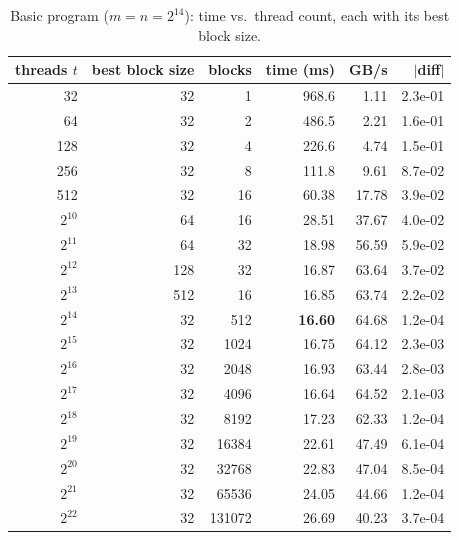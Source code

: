 \begin{table}[H]\centering\small
\caption{Basic program ($m=n=2^{14}$): time vs.\ thread count, each with its best block size.}\label{tab:q2basic}
\begin{tabular}{rrrrrr}
\toprule
threads $t$ & best block size & blocks & time (ms) & GB/s & $|$diff$|$ \\
\midrule
32 & 32 & 1 & 968.6 & 1.11 & 2.3e-01 \\
64 & 32 & 2 & 486.5 & 2.21 & 1.6e-01 \\
128 & 32 & 4 & 226.6 & 4.74 & 1.5e-01 \\
256 & 32 & 8 & 111.8 & 9.61 & 8.7e-02 \\
512 & 32 & 16 & 60.38 & 17.78 & 3.9e-02 \\
$2^{10}$ & 64 & 16 & 28.51 & 37.67 & 4.0e-02 \\
$2^{11}$ & 64 & 32 & 18.98 & 56.59 & 5.9e-02 \\
$2^{12}$ & 128 & 32 & 16.87 & 63.64 & 3.7e-02 \\
$2^{13}$ & 512 & 16 & 16.85 & 63.74 & 2.2e-02 \\
$2^{14}$ & 32 & 512 & \textbf{16.60} & 64.68 & 1.2e-04 \\
$2^{15}$ & 32 & 1024 & 16.75 & 64.12 & 2.3e-03 \\
$2^{16}$ & 32 & 2048 & 16.93 & 63.44 & 2.8e-03 \\
$2^{17}$ & 32 & 4096 & 16.64 & 64.52 & 2.1e-03 \\
$2^{18}$ & 32 & 8192 & 17.23 & 62.33 & 1.2e-04 \\
$2^{19}$ & 32 & 16384 & 22.61 & 47.49 & 6.1e-04 \\
$2^{20}$ & 32 & 32768 & 22.83 & 47.04 & 8.5e-04 \\
$2^{21}$ & 32 & 65536 & 24.05 & 44.66 & 1.2e-04 \\
$2^{22}$ & 32 & 131072 & 26.69 & 40.23 & 3.7e-04 \\
\bottomrule
\end{tabular}
\end{table}
